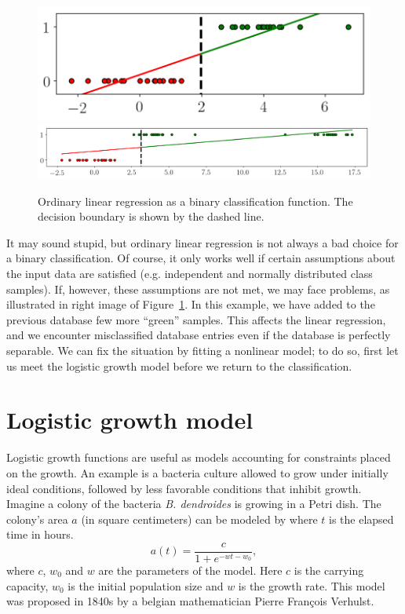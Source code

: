 \documentclass[notitlepage,oneside]{book}
\begin{document}
\begin{figure}[htb]
    \centering
    \includegraphics[width=.305\linewidth]{img/linear-1d-a.png}
    \includegraphics[width=.64\linewidth]{img/linear-1d-b.png}
    \caption{Ordinary linear regression as a binary classification function. The decision boundary is shown by the dashed line.}
    \label{fig:linear-regression-classification}
\end{figure}

It may sound stupid, but ordinary linear regression is not always a bad choice for a binary classification.
Of course, it only works well if certain assumptions about the input data are satisfied (e.g. independent and normally distributed class samples).
If, however, these assumptions are not met, we may face problems, as illustrated in right image of Figure~\ref{fig:linear-regression-classification}.
In this example, we have added to the previous database few more ``green'' samples. This affects the linear regression, and we encounter misclassified
database entries even if the database is perfectly separable. We can fix the situation by fitting a nonlinear model; to do so, first let us meet the logistic growth model
before we return to the classification.


\section{Logistic growth model}
\label{sec:logistic-growth}
Logistic growth functions are useful as models accounting for constraints placed on the growth.
An example is a bacteria culture allowed to grow under initially ideal conditions, followed by less favorable conditions that inhibit growth.
Imagine a colony of the bacteria \textit{B. dendroides} is growing in a Petri dish. The colony's area $a$ (in square centimeters) can be modeled by where $t$ is the elapsed time in hours.
\begin{equation}
\label{eq:logistic-growth}
a(t) = \frac{c}{1+e^{-wt - w_0}},
\end{equation}
where $c$, $w_0$ and $w$ are the parameters of the model. Here $c$ is the carrying capacity, $w_0$ is the initial population size and $w$ is the growth rate.
This model was proposed in 1840s by a belgian mathematician Pierre François Verhulst.
\end{document}
